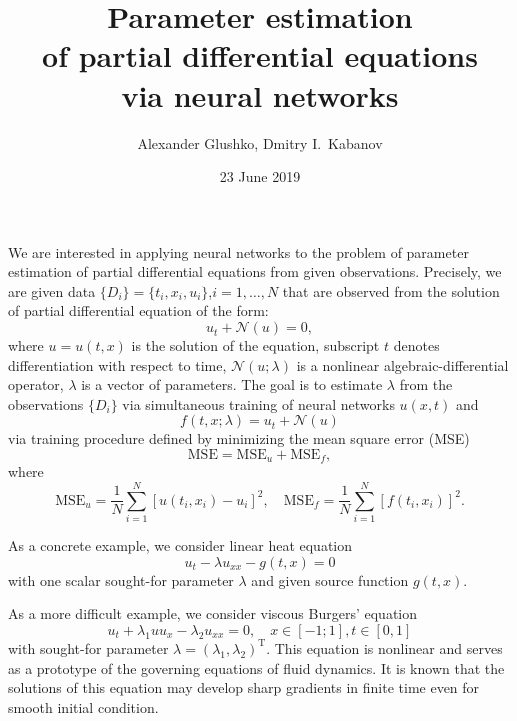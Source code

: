 \documentclass[a4paper, 12pt, english, parskip]{scrartcl}
\title{\vspace{-0.5cm}Parameter estimation\\of partial differential equations\\via neural networks}
\author{Alexander Glushko, Dmitry I.\ Kabanov}
\date{23 June 2019}
\newcommand{\Data}{\{D_i\}}
\newcommand{\MSE}{\ensuremath{\text{MSE}}}
\newcommand{\T}{\ensuremath{\text{T}}}
\begin{document}
\maketitle

We are interested in applying neural networks to the problem of parameter
estimation of partial differential equations from given observations.
Precisely, we are given data $\Data = \{t_i, x_i, u_i\}$,\(i=1,\dots,N\) that are
observed from the solution of partial differential equation of the form:
\begin{equation}
    u_t + \mathcal N(u) = 0,
\end{equation}
where  \(u=u(t, x)\) is the solution of the equation, subscript \(t\) denotes
differentiation with respect to time, \(\mathcal N(u; \lambda)\) is a nonlinear
algebraic-differential operator, \(\lambda\) is a vector of parameters. The goal
is to estimate \(\lambda\) from the observations \(\Data\) via simultaneous
training of neural networks \(u(x, t)\) and
\begin{equation}
    f(t, x; \lambda) = u_t + \mathcal N(u)
\end{equation}
via training procedure defined by minimizing the mean square error (MSE)
\begin{equation}
    \MSE = \MSE_u + \MSE_f,
\end{equation}
where
\begin{equation}
    \MSE_u = \frac{1}{N}
        \sum_{i=1}^{N} \left[ u\left(t_i, x_i\right) - u_i \right]^2, \quad
    \MSE_f = \frac{1}{N} \sum_{i=1}^N \left[f \left(t_i, x_i \right) \right]^2.
\end{equation}

As a concrete example, we consider linear heat equation
\begin{equation}
    u_t - \lambda u_{xx} - g(t, x) = 0
\end{equation}
with one scalar sought-for parameter \(\lambda\) and given source function
\(g(t, x) \).

As a more difficult example, we consider viscous Burgers’ equation    
\begin{equation}
    u_t + \lambda_1 u u_x - \lambda_2 u_{xx} = 0, \quad x\in[-1; 1], t\in[0, 1]
\end{equation}
with sought-for parameter \(\lambda = \left( \lambda_1, \lambda_2 \right)^\T \).
This equation is nonlinear and serves as a prototype of the governing
equations of fluid dynamics. It is known that the solutions of this equation
may develop sharp gradients in finite time even for smooth initial condition.
\end{document}
